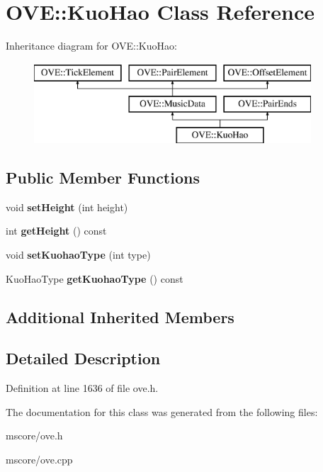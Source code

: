 \hypertarget{class_o_v_e_1_1_kuo_hao}{}\section{O\+VE\+:\+:Kuo\+Hao Class Reference}
\label{class_o_v_e_1_1_kuo_hao}
Inheritance diagram for O\+VE\+:\+:Kuo\+Hao\+:\begin{figure}[H]
\begin{center}
\leavevmode
\includegraphics[height=3.000000cm]{class_o_v_e_1_1_kuo_hao}
\end{center}
\end{figure}
\subsection*{Public Member Functions}
\begin{DoxyCompactItemize}
\item 
\mbox{\label{class_o_v_e_1_1_kuo_hao_abc3d2357e88e078a0a908761a5600661}} 
void {\bfseries set\+Height} (int height)
\item 
\mbox{\label{class_o_v_e_1_1_kuo_hao_a25763a2ea885b172fbe836c94f779a38}} 
int {\bfseries get\+Height} () const
\item 
\mbox{\label{class_o_v_e_1_1_kuo_hao_a08ca38d6d391ba4d4eceda56d891196a}} 
void {\bfseries set\+Kuohao\+Type} (int type)
\item 
\mbox{\label{class_o_v_e_1_1_kuo_hao_afade37208675ff9dc60919fe961f5018}} 
Kuo\+Hao\+Type {\bfseries get\+Kuohao\+Type} () const
\end{DoxyCompactItemize}
\subsection*{Additional Inherited Members}


\subsection{Detailed Description}


Definition at line 1636 of file ove.\+h.



The documentation for this class was generated from the following files\+:\begin{DoxyCompactItemize}
\item 
mscore/ove.\+h\item 
mscore/ove.\+cpp\end{DoxyCompactItemize}
